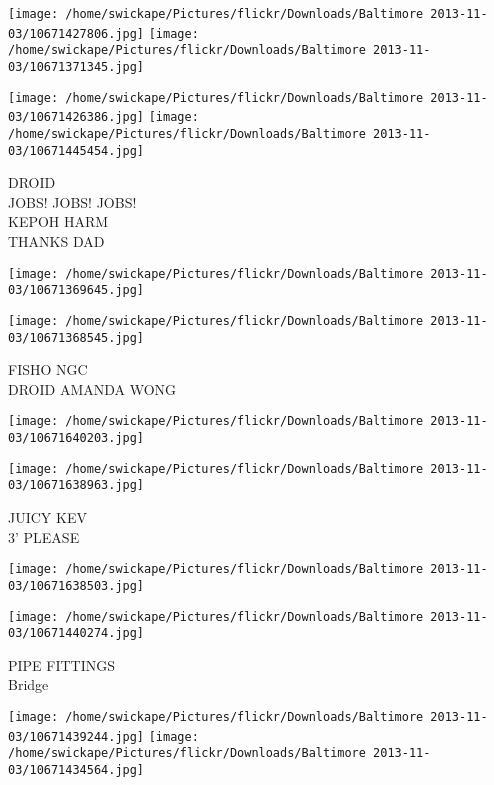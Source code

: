 \documentclass[10pt,letterpaper]{article}
\begin{document}
\texttt{[image: /home/swickape/Pictures/flickr/Downloads/Baltimore 2013-11-03/10671427806.jpg]}
\texttt{[image: /home/swickape/Pictures/flickr/Downloads/Baltimore 2013-11-03/10671371345.jpg]}

\texttt{[image: /home/swickape/Pictures/flickr/Downloads/Baltimore 2013-11-03/10671426386.jpg]}
\texttt{[image: /home/swickape/Pictures/flickr/Downloads/Baltimore 2013-11-03/10671445454.jpg]}

DROID\\
JOBS! JOBS! JOBS!\\
KEPOH HARM\\
THANKS DAD\\
\pagebreak

\texttt{[image: /home/swickape/Pictures/flickr/Downloads/Baltimore 2013-11-03/10671369645.jpg]}

\vspace{0.25in}
\texttt{[image: /home/swickape/Pictures/flickr/Downloads/Baltimore 2013-11-03/10671368545.jpg]}

FISHO NGC\\
DROID AMANDA WONG\\
\pagebreak

\texttt{[image: /home/swickape/Pictures/flickr/Downloads/Baltimore 2013-11-03/10671640203.jpg]}

\vspace{0.25in}
\texttt{[image: /home/swickape/Pictures/flickr/Downloads/Baltimore 2013-11-03/10671638963.jpg]}

JUICY KEV\\
3' PLEASE\\
\pagebreak

\texttt{[image: /home/swickape/Pictures/flickr/Downloads/Baltimore 2013-11-03/10671638503.jpg]}

\vspace{0.25in}
\texttt{[image: /home/swickape/Pictures/flickr/Downloads/Baltimore 2013-11-03/10671440274.jpg]}

PIPE FITTINGS\\
Bridge\\
\pagebreak

\texttt{[image: /home/swickape/Pictures/flickr/Downloads/Baltimore 2013-11-03/10671439244.jpg]}
\texttt{[image: /home/swickape/Pictures/flickr/Downloads/Baltimore 2013-11-03/10671434564.jpg]}
\end{document}
